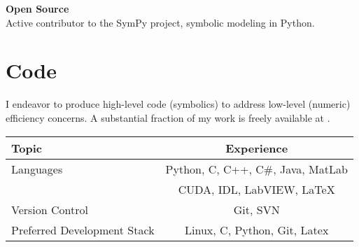 \documentclass[margin,line]{res}
\begin{document}
\begin{resume}
{\bf Open Source }\\
Active contributor to the SymPy project, symbolic modeling in Python.

\section{\sc Code}

I endeavor to produce high-level code (symbolics) to address low-level (numeric) efficiency concerns. A substantial fraction of my work is freely available at .

\begin{center}
\begin{tabular}{|l | c| }
\hline
Topic  & Experience  \\
\hline
\hline
Languages & Python, C,  C++, C\#, Java, MatLab \\
&  CUDA, IDL, LabVIEW, LaTeX \\ 
\hline
Version Control & Git, SVN \\
\hline
Preferred Development Stack & Linux, C, Python, Git, Latex\\
\hline
\end{tabular}
\end{center}


\end{resume}
\end{document}
